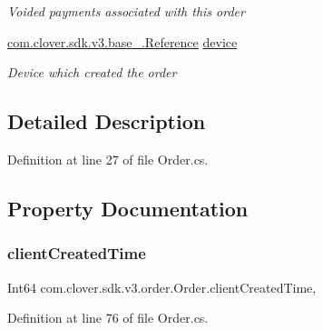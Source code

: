 \begin{DoxyCompactItemize}
\begin{DoxyCompactList}\small\item\em Voided payments associated with this order \end{DoxyCompactList}\item 
\hyperlink{classcom_1_1clover_1_1sdk_1_1v3_1_1base___1_1_reference}{com.\+clover.\+sdk.\+v3.\+base\+\_\+.\+Reference} \hyperlink{classcom_1_1clover_1_1sdk_1_1v3_1_1order_1_1_order_a1501b94de8b5efc7c434677b6d89b1ff}{device}
\begin{DoxyCompactList}\small\item\em Device which created the order \end{DoxyCompactList}\end{DoxyCompactItemize}


\subsection{Detailed Description}


Definition at line 27 of file Order.\+cs.



\subsection{Property Documentation}
\mbox{\label{classcom_1_1clover_1_1sdk_1_1v3_1_1order_1_1_order_a8cce0929d31cd32654990b9bac4b7f2a}} 
\subsubsection{\texorpdfstring{client\+Created\+Time}{clientCreatedTime}}
{\footnotesize\ttfamily Int64 com.\+clover.\+sdk.\+v3.\+order.\+Order.\+client\+Created\+Time\hspace{0.3cm}{\ttfamily [get]}, {\ttfamily [set]}}



Definition at line 76 of file Order.\+cs.

\mbox{\label{classcom_1_1clover_1_1sdk_1_1v3_1_1order_1_1_order_a17baf1a4ea4ec73b18ef133460a27dd7}} 
